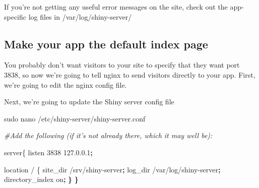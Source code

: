 \documentclass[
]{book}
\newenvironment{Shaded}{\begin{snugshade}}{\end{snugshade}}
\newcommand{\CommentTok}[1]{\textcolor[rgb]{0.56,0.35,0.01}{\textit{#1}}}
\newcommand{\ErrorTok}[1]{\textcolor[rgb]{0.64,0.00,0.00}{\textbf{#1}}}
\newcommand{\ExtensionTok}[1]{#1}
\newcommand{\FunctionTok}[1]{\textcolor[rgb]{0.00,0.00,0.00}{#1}}
\newcommand{\KeywordTok}[1]{\textcolor[rgb]{0.13,0.29,0.53}{\textbf{#1}}}
\newcommand{\NormalTok}[1]{#1}
\newcommand{\StringTok}[1]{\textcolor[rgb]{0.31,0.60,0.02}{#1}}
\newcommand{\VariableTok}[1]{\textcolor[rgb]{0.00,0.00,0.00}{#1}}
\begin{document}
If you're not getting any useful error messages on the site, check out the app-specific log files in /var/log/shiny-server/

\hypertarget{make-your-app-the-default-index-page}{%
\subsection{Make your app the default index page}\label{make-your-app-the-default-index-page}}

You probably don't want visitors to your site to specify that they want port 3838, so now we're going to tell nginx to send visitors directly to your app.
First, we're going to edit the nginx config file.

\begin{Shaded}
\end{Shaded}

Next, we're going to update the Shiny server config file

\begin{Shaded}
\begin{Highlighting}[]

\FunctionTok{sudo}\NormalTok{ nano /etc/shiny{-}server/shiny{-}server.conf}

\CommentTok{\#Add the following (if it’s not already there, which it may well be):}

\ExtensionTok{server\{}
    \ExtensionTok{listen}\NormalTok{ 3838 127.0.0.1}\KeywordTok{;}

    \ExtensionTok{location}\NormalTok{ / \{}
      \ExtensionTok{site\_dir}\NormalTok{ /srv/shiny{-}server}\KeywordTok{;}
      \ExtensionTok{log\_dir}\NormalTok{ /var/log/shiny{-}server}\KeywordTok{;}
      \ExtensionTok{directory\_index}\NormalTok{ on}\KeywordTok{;}
    \ErrorTok{\}}
\ErrorTok{\}}
\end{Highlighting}
\end{Shaded}
\end{document}

